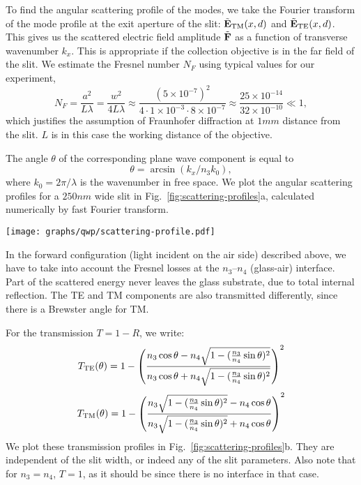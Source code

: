 To find the angular scattering profile of the modes, we take the Fourier transform of the mode profile at the exit aperture of the slit: $\tilde{\mathbf{E}}_{\text{TM}} (x, d)$ and $\tilde{\mathbf{E}}_{\text{TE}} (x, d)$.
This gives us the scattered electric field amplitude $\tilde{\mathbf{F}}$ as a function of transverse wavenumber $k_x$.
This is appropriate if the collection objective is in the far field of the slit.
We estimate the Fresnel number $N_F$ using typical values for our experiment,
%
\begin{equation}
N_F = \frac{a^2}{L\lambda} = \frac{w^2}{4L\lambda}
\approx \frac{(5\times 10^{-7})^2}{4 \cdot 1\times 10^{-3} \cdot 8\times 10^{-7}}
\approx \frac{25\times 10^{-14}}{32\times 10^{-10}} \ll 1,
\end{equation}
%
which justifies the assumption of Fraunhofer diffraction at $1\unit{mm}$ distance from the slit. $L$ is in this case the working distance of the objective.

The angle $\theta$ of the corresponding plane wave component is equal to
\begin{equation}\label{qwp:eq:spatial-frequency-angle}
\theta = \arcsin (k_x / n_3 k_0),
\end{equation}
where $k_0 = 2\pi/\lambda$ is the wavenumber in free space.
We plot the angular scattering profiles for a $250\unit{nm}$ wide slit in Fig.~\ref{fig:scattering-profiles}a, calculated numerically by fast Fourier transform.
%
\begin{figure*}[tb]
\centering\texttt{[image: graphs/qwp/scattering-profile.pdf]}
\caption{(a) Scattering profile of a $250\unit{nm}$ wide slit, as a function of angle.
(b) Transmission of scattered light at the $n_3$--$n_4$ interface as a function of scattering angle.
Note the Brewster angle at the point where the \gls{TM} transmission reaches unity.
Other parameters: $\lambda=800\unit{nm}$, $n_2=1.0$, $n_3=1.5$, $n_4=1.0$.}
\label{fig:scattering-profiles}
\end{figure*}

In the forward configuration (light incident on the air side) described above, we have to take into account the Fresnel losses at the $n_3$--$n_4$ (glass-air) interface.
Part of the scattered energy never leaves the glass substrate, due to total internal reflection.
The \gls{TE} and \gls{TM} components are also transmitted differently, since there is a Brewster angle for \gls{TM}.

For the transmission $T = 1 - R$, we write:
\begin{equation}\label{eq:fresnel-te}
T_{\text{TE}}(\theta) = 1 - \left(
	\frac{n_3\cos\theta - n_4\sqrt{1 - (\frac{n_3}{n_4}\sin\theta)^2}}
		{n_3\cos\theta + n_4\sqrt{1 - (\frac{n_3}{n_4}\sin\theta)^2}}
\right)^2
\end{equation}
\begin{equation}\label{eq:fresnel-tm}
T_{\text{TM}}(\theta) = 1 - \left(
	\frac{n_3\sqrt{1 - (\frac{n_3}{n_4}\sin\theta)^2} - n_4\cos\theta}
		{n_3\sqrt{1 - (\frac{n_3}{n_4}\sin\theta)^2} + n_4\cos\theta}
\right)^2
\end{equation}
We plot these transmission profiles in Fig.~\ref{fig:scattering-profiles}b.
They are independent of the slit width, or indeed any of the slit parameters.
Also note that for $n_3=n_4$, $T=1$, as it should be since there is no interface in that case.

